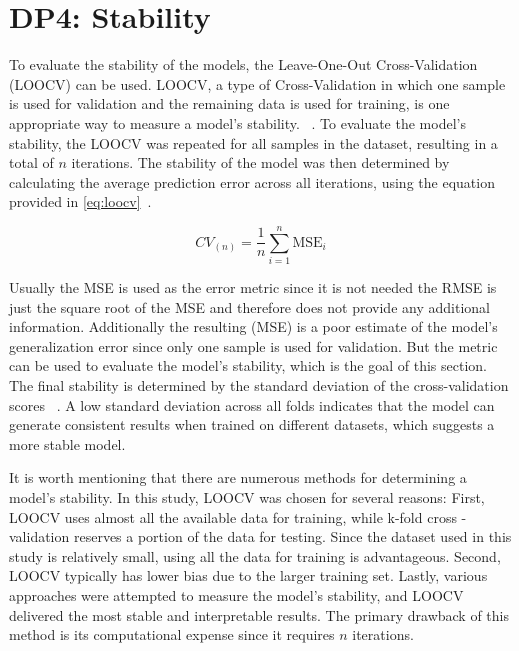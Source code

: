 \section{DP4: Stability}\label{sec:stability}
To evaluate the stability of the models, the Leave-One-Out Cross-Validation (LOOCV) can be used.
LOOCV, a type of Cross-Validation in which one sample is used for validation and the remaining data is used for
training, is one appropriate way to measure a model's stability.
~\cite[p. 200--201]{gareth2013introduction}.
To evaluate the model's stability, the \ac{LOOCV} was repeated for all samples in the dataset, resulting in a total
of $n$ iterations.
The stability of the model was then determined by calculating the average prediction error across all iterations,
using the equation provided in \cref{eq:loocv}~\cite[p. 201]{gareth2013introduction}.

\begin{tcolorbox}[arc=0pt,boxrule=0.5pt]
    \begin{equation}
        CV_{(n)} = \frac{1}{n} \sum_{i=1}^{n} \text{MSE}_{i}\label{eq:loocv}
    \end{equation}
\end{tcolorbox}

Usually the MSE is used as the error metric since it is not needed the RMSE is just the square root of the MSE and
therefore does not provide any additional information.
Additionally the resulting (\ac{MSE}) is a poor estimate of the model's
generalization error since only one sample is used for validation.
But the metric can be used to evaluate the model's stability, which is the goal of this section.
The final stability is determined by the standard deviation of the cross-validation scores
~\cite[p. 201]{gareth2013introduction}.
A low standard deviation across all folds indicates that the model can generate consistent results when trained on
different datasets, which suggests a more stable model.

It is worth mentioning that there are numerous methods for determining a model's stability.
In this study, \ac{LOOCV} was chosen for several reasons:
First, \ac{LOOCV} uses almost all the available data for training, while k-fold cross -validation reserves a portion
of the data for testing.
Since the dataset used in this study is relatively small, using all the data for training is advantageous.
Second, \ac{LOOCV} typically has lower bias due to the larger training set.
Lastly, various approaches were attempted to measure the model's stability, and \ac{LOOCV} delivered
the most stable and interpretable results.
The primary drawback of this method is its computational expense since it
requires $n$ iterations.

